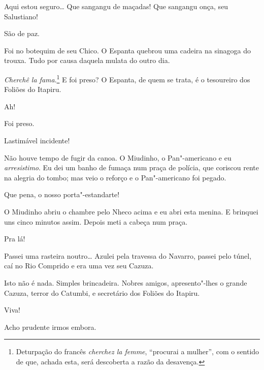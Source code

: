 


  
Aqui estou seguro\ldots{} Que sangangu de maçadas!
Que sangangu onça, seu Salustiano!

 São de paz.

 Foi no botequim de
seu Chico. O Espanta quebrou uma cadeira na sinagoga
do trouxa. Tudo por causa daquela mulata do outro dia.

 \textit{Cherchê la fama}.\footnote{
Deturpação do francês \textit{cherchez la femme}, ``procurai a mulher'', com
o sentido de que, achada esta, será descoberta a razão da desavença.}
E foi preso?  O Espanta, de quem se trata,
é o tesoureiro dos Foliões do Itapiru.

 Ah!

 Foi preso.

 Lastimável incidente!

 Não houve tempo de
fugir da canoa. O Miudinho, o Pan"-americano e eu
\textit{arresistimo}. Eu dei um banho de
fumaça num praça de polícia, que coriscou rente na
alegria do tombo; mas veio o reforço e o
Pan"-americano foi pegado.

 Que pena, o nosso
porta"-estandarte!

 O Miudinho abriu o chambre pelo Nheco
acima e eu abri esta menina.  E brinquei uns
cinco minutos assim. Depois meti a cabeça num praça.

 Pra lá!

 Passei uma rasteira noutro\ldots{}  Azulei pela travessa do Navarro, passei pelo túnel, caí no
Rio Comprido e era uma vez seu Cazuza. 

 
 Isto não é nada.  Simples brincadeira.  Nobres
amigos, apresento"-lhes o grande Cazuza, terror do Catumbi, e secretário dos
Foliões do Itapiru.

 Viva!

   Acho prudente irmos embora.

